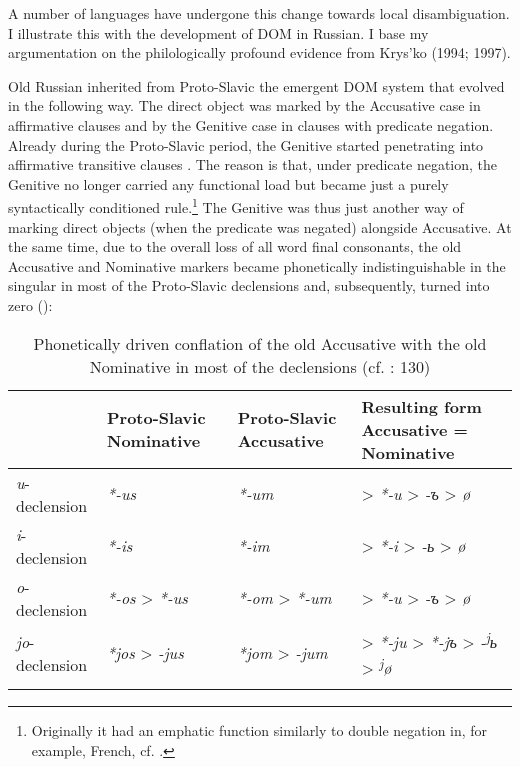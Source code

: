 \documentclass[output=paper]{langsci/langscibook}
\begin{document}
A number of languages have undergone this change towards local disambiguation. I illustrate this with the development of DOM in Russian. I base my argumentation on the philologically profound evidence from Krys’ko (1994; 1997). 

Old Russian inherited from Proto-Slavic the emergent DOM system that evolved in the following way. The direct object was marked by the Accusative case in affirmative clauses and by the Genitive case in clauses with predicate negation. Already during the Proto-Slavic period, the Genitive started penetrating into affirmative transitive clauses \citep{Klenin1983}. The reason is that, under predicate negation, the Genitive no longer carried any functional load but became just a purely syntactically conditioned rule.\footnote{Originally it had an emphatic function similarly to double negation in, for example, French, cf. \citet{Kuryłowicz1971}.} The Genitive was thus just another way of marking direct objects (when the predicate was negated) alongside Accusative. At the same time, due to the overall loss of all word final consonants, the old Accusative and Nominative markers became phonetically indistinguishable in the singular in most of the Proto-Slavic declensions and, subsequently, turned into zero ():

\begin{table}
\begin{tabularx}{\textwidth}{lp{2.3cm}p{2.3cm}Q}
\lsptoprule
\bfseries ~ & \bfseries Proto-Slavic Nominative & \bfseries Proto-Slavic Accusative & {\bfseries Resulting form}
\bfseries Accusative = Nominative\\
\midrule
\textit{u}{}-declension & \textit{*-us} & \textit{*-um} & > \textit{*-u} > \textit{-{ъ}} > \textit{ø}\\
\textit{i}{}-declension & \textit{*-is} & \textit{*-im} & > \textit{*-i} > \textit{-{ь}} > \textit{ø}\\
\textit{o}{}-declension & \textit{*-os} > \textit{*-us} & \textit{*-om} > \textit{*-um} & > \textit{*-u} > \textit{-{ъ}} > \textit{ø}\\
\textit{jo}{}-declension & \textit{*jos} > \textit{-jus} & \textit{*jom} > \textit{-jum} & > \textit{*-ju} > \textit{*}\textit{{}-j}\textit{{ъ} }> \textit{-\textsuperscript{j}}\textit{{ь}} > \textit{\textsuperscript{j}}\textit{ø}\\
\lspbottomrule
\end{tabularx}

\caption{Phonetically driven conflation of the old Accusative with the old Nominative in most of the declensions (cf. \citealt{Arumaa1985}: 130)}
\label{tab:serzant:1}
\end{table}
\end{document}

